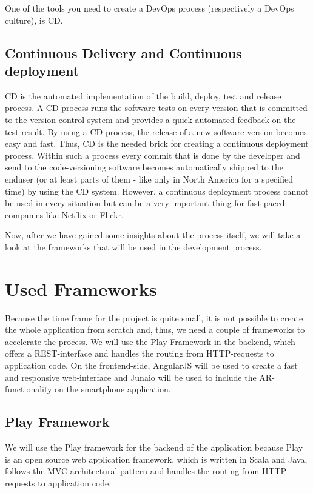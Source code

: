One of the tools you need to create a DevOps process (respectively a DevOps culture), is \ac{CD}.

\subsection{Continuous Delivery and Continuous deployment}
\ac{CD} is the automated implementation of the build, deploy, test and release process. A \ac{CD} process runs the software tests on every version that is committed to the version-control system and provides a quick automated feedback on the test result. By using a \ac{CD} process, the release of a new software version becomes easy and fast. Thus, \ac{CD} is the needed brick for creating a continuous deployment process. Within such a process every commit that is done by the developer and send to the code-versioning software becomes automatically shipped to the enduser (or at least parts of them - like only in North America for a specified time) by using the \ac{CD} system. However, a continuous deployment process cannot be used in every situation but can be a very important thing for fast paced companies like Netflix or Flickr.

Now, after we have gained some insights about the process itself, we will take a look at the frameworks that will be used in the development process.

\section{Used Frameworks}
Because the time frame for the project is quite small, it is not possible to create the whole application from scratch and, thus, we need a couple of frameworks to accelerate the process. We will use the Play-Framework in the backend, which offers a \ac{REST}-interface and handles the routing from \ac{HTTP}-requests to application code. On the frontend-side, AngularJS will be used to create a fast and responsive web-interface and Junaio will be used to include the \ac{AR}-functionality on the smartphone application.

\subsection{Play Framework}	
\label{Play2}
We will use the Play framework for the backend of the application because Play is an open source web application framework, which is written in Scala and Java, follows the \ac{MVC} architectural pattern and handles the routing from \ac{HTTP}-requests to application code. 

